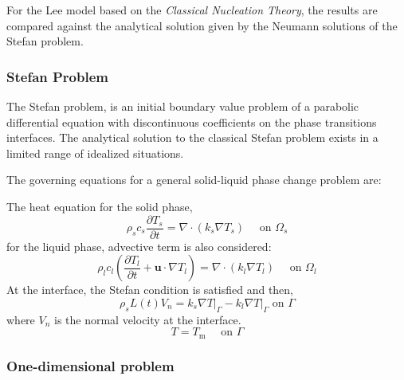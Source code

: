 \noindent For the Lee model based on the \textit{Classical Nucleation Theory}, the results are compared against the analytical solution given by the Neumann solutions of the Stefan problem.

\clearpage
\subsubsection{Stefan Problem}

\setlength{\parindent}{0.5cm} The Stefan problem, is an initial boundary value problem of a parabolic differential equation with discontinuous coefficients on the phase transitions interfaces. The analytical solution to the classical Stefan problem exists in a limited range of idealized situations.

\noindent The governing equations for a general solid-liquid phase change problem are:

\noindent The heat equation for the solid phase,
\begin{equation}
\rho_{s} c_{s} \frac{\partial T_{s}}{\partial t}=\nabla \cdot\left(k_{s} \nabla T_{s}\right) \quad \text { on } \Omega_{s}
\label{3.42}
\end{equation}
for the liquid phase, advective term is also considered:
\begin{equation}
\rho_{l} c_{l}\left(\frac{\partial T_{l}}{\partial t}+\mathbf{u} \cdot \nabla T_{l}\right)=\nabla \cdot\left(k_{l} \nabla T_{l}\right) \quad \text { on } \Omega_{l}
\label{3.43}
\end{equation}
At the interface, the Stefan condition is satisfied and then,
\begin{equation}
\rho_{s} L(t) V_{n}=\left.k_{s} \nabla T\right|_{\Gamma}-\left.k_{l} \nabla T\right|_{\Gamma} \text { on } \Gamma
\label{3.44}
\end{equation}
where $V_{n}$ is the normal velocity at the interface.
\begin{equation}
T=T_{\mathrm{m}} \quad \text { on } \Gamma
\end{equation}
\subsubsection*{One-dimensional problem}

